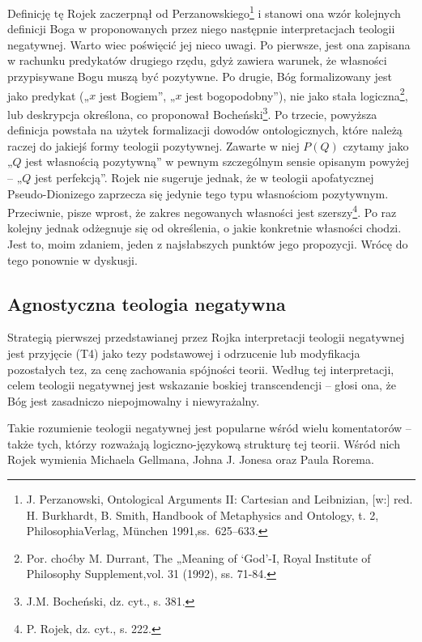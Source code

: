 Definicję tę Rojek zaczerpnął od Perzanowskiego\footnote{J.
Perzanowski, Ontological Arguments II: Cartesian and Leibnizian, [w:]
red. H. Burkhardt, B. Smith, Handbook of Metaphysics and Ontology, t.
2, PhilosophiaVerlag, München 1991,ss.~625–633. } i stanowi ona
wzór kolejnych definicji Boga w proponowanych przez niego następnie
interpretacjach teologii negatywnej. Warto wiec poświęcić jej nieco
uwagi. Po pierwsze, jest ona zapisana w rachunku predykatów drugiego
rzędu, gdyż zawiera warunek, że własności przypisywane Bogu muszą być
pozytywne. Po drugie, Bóg formalizowany jest jako predykat („$x$ jest
Bogiem”, „$x$ jest bogopodobny”), nie jako stała logiczna\footnote{Por.
choćby M. Durrant, The „Meaning of ‘God’-I, Royal Institute of
Philosophy Supplement,vol. 31 (1992), ss. 71-84. }, lub deskrypcja
określona, co proponował Bocheński\footnote{J.M. Bocheński, dz. cyt.,
s. 381. }. Po trzecie, powyższa definicja powstała na użytek
formalizacji dowodów ontologicznych, które należą raczej do jakiejś
formy teologii pozytywnej. Zawarte w niej $P(Q)$ czytamy jako „$Q$ jest
własnością pozytywną” w pewnym szczególnym sensie opisanym powyżej -- „$Q$
jest perfekcją”. Rojek nie sugeruje jednak, że w teologii apofatycznej
Pseudo-Dionizego zaprzecza się jedynie tego typu własnościom
pozytywnym. Przeciwnie, pisze wprost, że zakres negowanych własności
jest szerszy\footnote{P. Rojek, dz. cyt., s. 222. }. Po raz
kolejny jednak odżegnuje się od określenia, o jakie konkretnie
własności chodzi. Jest to, moim zdaniem, jeden z najsłabszych punktów
jego propozycji. Wrócę do tego ponownie w dyskusji.


\subsection{Agnostyczna teologia negatywna}

Strategią pierwszej przedstawianej przez Rojka interpretacji teologii
negatywnej jest przyjęcie (T4) jako tezy podstawowej i odrzucenie lub
modyfikacja pozostałych tez, za cenę zachowania spójności teorii.
Według tej interpretacji, celem teologii negatywnej jest wskazanie
boskiej transcendencji -- głosi ona, że Bóg jest zasadniczo
niepojmowalny i niewyrażalny.

Takie rozumienie teologii negatywnej jest popularne wśród wielu
komentatorów -- także tych, którzy rozważają logiczno-językową strukturę
tej teorii. Wśród nich Rojek wymienia Michaela Gellmana, Johna J.
Jonesa oraz Paula Rorema.

